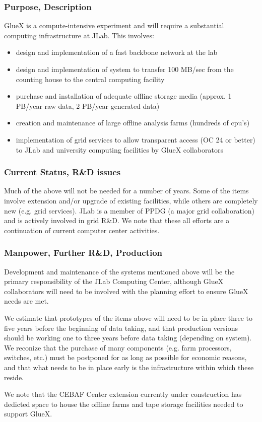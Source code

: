 \subsubsection*{Purpose, Description}

GlueX is a compute-intensive experiment and will require a substantial
computing infrastructure at JLab.  This involves:
\begin{itemize}
\item design and implementation of a fast backbone network at the lab
\item design and implementation of system to transfer 100 MB/sec from
  the counting house to the central computing facility
\item purchase and installation of adequate offline storage media
  (approx. 1 PB/year raw data, 2 PB/year generated data)
\item creation and maintenance of large offline analysis farms (hundreds of cpu's)
\item implementation of grid services to allow
transparent access (OC 24 or better) to JLab and university computing
facilities by GlueX collaborators
\end{itemize}



\subsubsection*{Current Status, R\&D issues}

Much of the above will not be needed for a number of years.  Some of
the items involve extension and/or upgrade of existing facilities,
while others are completely new (e.g. grid services).  JLab is a
member of PPDG (a major grid collaboration) and is actively involved
in grid R\&D.  We note that these all efforts are a continuation of
current computer center activities.



\subsubsection*{Manpower, Further R\&D, Production}

Development and maintenance of the systems mentioned above will be the
primary responsibility of the JLab Computing Center, although GlueX
collaborators will need to be involved with the planning effort to
ensure GlueX needs are met.  

We estimate that prototypes of the items above will need to be in
place three to five years before the beginning of data taking, and
that production versions should be working one to three years before
data taking (depending on system).  We reconize that the purchase of
many components (e.g. farm processors, switches, etc.) must be
postponed for as long as possible for economic reasons, and that what
needs to be in place early is the infrastructure within which these
reside.

We note that the CEBAF Center extension currently under construction
has dedicted space to house the offline farms and tape storage
facilities needed to support GlueX.


